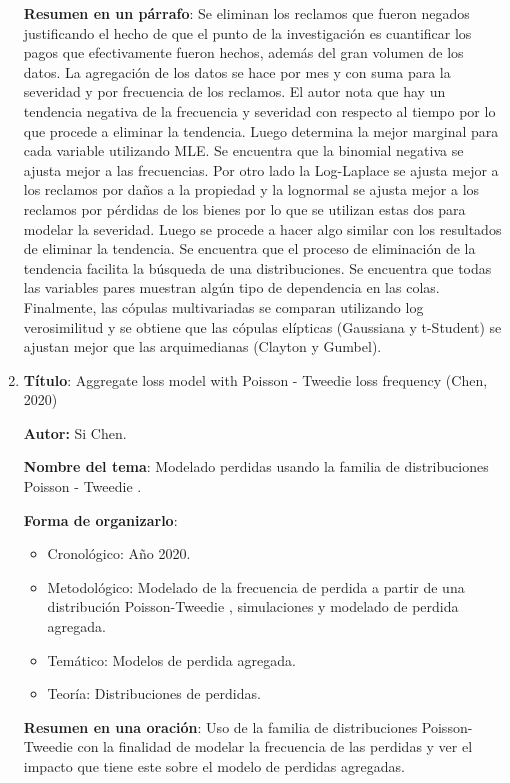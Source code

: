 \documentclass[
  letterpaper,
  onepage,
  openany]{scrreprt}
\begin{document}
\begin{enumerate}
  \textbf{Resumen en un párrafo}: Se eliminan los reclamos que fueron
  negados justificando el hecho de que el punto de la investigación es
  cuantificar los pagos que efectivamente fueron hechos, además del gran
  volumen de los datos. La agregación de los datos se hace por mes y con
  suma para la severidad y por frecuencia de los reclamos. El autor nota
  que hay un tendencia negativa de la frecuencia y severidad con
  respecto al tiempo por lo que procede a eliminar la tendencia. Luego
  determina la mejor marginal para cada variable utilizando MLE. Se
  encuentra que la binomial negativa se ajusta mejor a las frecuencias.
  Por otro lado la Log-Laplace se ajusta mejor a los reclamos por daños
  a la propiedad y la lognormal se ajusta mejor a los reclamos por
  pérdidas de los bienes por lo que se utilizan estas dos para modelar
  la severidad. Luego se procede a hacer algo similar con los resultados
  de eliminar la tendencia. Se encuentra que el proceso de eliminación
  de la tendencia facilita la búsqueda de una distribuciones. Se
  encuentra que todas las variables pares muestran algún tipo de
  dependencia en las colas. Finalmente, las cópulas multivariadas se
  comparan utilizando log verosimilitud y se obtiene que las cópulas
  elípticas (Gaussiana y t-Student) se ajustan mejor que las
  arquimedianas (Clayton y Gumbel).
\item
  \textbf{Título}: Aggregate loss model with Poisson - Tweedie loss
  frequency (Chen, 2020)

  \textbf{Autor:} Si Chen.

  \textbf{Nombre del tema}: Modelado perdidas usando la familia de
  distribuciones Poisson - Tweedie .

  \textbf{Forma de organizarlo}:

  \begin{itemize}
  \item
    Cronológico: Año 2020.
  \item
    Metodológico: Modelado de la frecuencia de perdida a partir de una
    distribución Poisson-Tweedie , simulaciones y modelado de perdida
    agregada.
  \item
    Temático: Modelos de perdida agregada.
  \item
    Teoría: Distribuciones de perdidas.
  \end{itemize}

  \textbf{Resumen en una oración}: Uso de la familia de distribuciones
  Poisson-Tweedie con la finalidad de modelar la frecuencia de las
  perdidas y ver el impacto que tiene este sobre el modelo de perdidas
  agregadas.


\end{enumerate}
\end{document}
